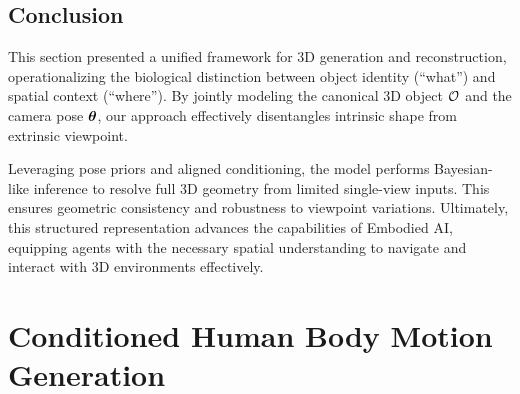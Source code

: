 \documentclass[../../book-main.tex]{subfiles}
\begin{document}
\subsection{Conclusion}
This section presented a unified framework for 3D generation and
reconstruction, operationalizing the biological distinction between
object identity (``what'') and spatial context (``where''). By
jointly modeling the canonical 3D object $\mathcal{O}$ and the camera
pose $\boldsymbol{\theta}$, our approach effectively disentangles intrinsic shape
from extrinsic viewpoint.

Leveraging pose priors and aligned conditioning, the model performs
Bayesian-like inference to resolve full 3D geometry from limited
single-view inputs. This ensures geometric consistency and robustness
to viewpoint variations. Ultimately, this structured representation
advances the capabilities of Embodied AI, equipping agents with the
necessary spatial understanding to navigate and interact with 3D
environments effectively.

\section{Conditioned Human Body Motion Generation}
\label{sec:egoallo}

%
\end{document}
